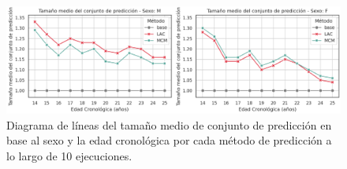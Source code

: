 \begin{figure}[h]
    \centering
    \includegraphics[width=\textwidth]{apendices/imagenes/SE-linechart_MPSS_by_age_and_sex.png}
    \caption[
        Problema de estimación de sexo:
        Diagrama de líneas del tamaño medio de conjunto de predicción en base al sexo y la edad cronológica por cada método de predicción a lo largo de 10 ejecuciones.
    ]{
        Diagrama de líneas del tamaño medio de conjunto de predicción en base al sexo y la edad cronológica por cada método de predicción a lo largo de 10 ejecuciones.
    }
    \label{fig:SE-linechart_MPSS_by_age_and_sex}
\end{figure}


